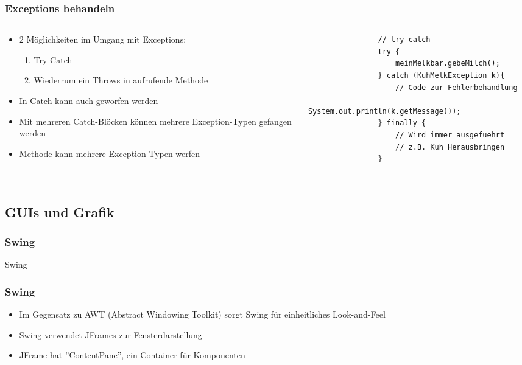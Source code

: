 \begin{frame}[fragile]
	\frametitle{Exceptions behandeln}
	\begin{columns}
		\begin{column}{0.5\textwidth}
			\small
			\begin{itemize}
			  \item 2 M\"oglichkeiten im Umgang mit
			  Exceptions:
			  \begin{enumerate}
			    \item Try-Catch
			    \item Wiederrum ein Throws in aufrufende
			    Methode
			  \end{enumerate}
			  \item In Catch kann auch geworfen werden
			  \item Mit mehreren Catch-Bl\"ocken k\"onnen
			  mehrere Exception-Typen gefangen werden
			  \item Methode kann mehrere Exception-Typen
			  werfen
			\end{itemize}
		\end{column}
		\begin{column}{0.5\textwidth}
			\begin{lstlisting}
				// try-catch
				try {
					meinMelkbar.gebeMilch();
				} catch (KuhMelkException k){
					// Code zur Fehlerbehandlung
					System.out.println(k.getMessage());
				} finally {
					// Wird immer ausgefuehrt
					// z.B. Kuh Herausbringen
				}
				
			\end{lstlisting}
		\end{column}
	\end{columns}
\end{frame}

\subsection{GUIs und Grafik} 
\begin{frame}[fragile]
	\frametitle{Swing}
	\huge Swing
\end{frame} 

\begin{frame}[fragile]
	\frametitle{Swing}
	\begin{itemize}
	  \item Im Gegensatz zu AWT (Abstract Windowing Toolkit)
	  sorgt Swing f\"ur einheitliches Look-and-Feel
	  \item Swing verwendet JFrames zur Fensterdarstellung
	  \item JFrame hat ''ContentPane'', ein Container f\"ur
	  Komponenten
	\end{itemize}
\end{frame}

